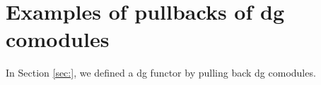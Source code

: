 \section{Examples of pullbacks of dg comodules}
In Section \ref{sec:}, we defined a dg functor 
by pulling back dg comodules. 